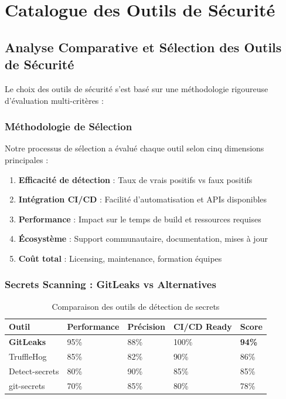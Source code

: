 \documentclass[12pt,a4paper]{report}
\begin{document}
\section{Catalogue des Outils de Sécurité}

\subsection{Analyse Comparative et Sélection des Outils de Sécurité}

Le choix des outils de sécurité s'est basé sur une méthodologie rigoureuse d'évaluation multi-critères :

\subsubsection{Méthodologie de Sélection}

Notre processus de sélection a évalué chaque outil selon cinq dimensions principales :
\begin{enumerate}
    \item \textbf{Efficacité de détection} : Taux de vrais positifs vs faux positifs
    \item \textbf{Intégration CI/CD} : Facilité d'automatisation et APIs disponibles  
    \item \textbf{Performance} : Impact sur le temps de build et ressources requises
    \item \textbf{Écosystème} : Support communautaire, documentation, mises à jour
    \item \textbf{Coût total} : Licensing, maintenance, formation équipes
\end{enumerate}

\subsubsection{Secrets Scanning : GitLeaks vs Alternatives}

\begin{table}[H]
    \centering
    \begin{tabularx}{\textwidth}{|X|X|X|X|X|}
        \hline
        \textbf{Outil} & \textbf{Performance} & \textbf{Précision} & \textbf{CI/CD Ready} & \textbf{Score} \\
        \hline
        \textbf{GitLeaks} & 95\% & 88\% & 100\% & \textbf{94\%} \\
        \hline
        TruffleHog & 85\% & 82\% & 90\% & 86\% \\
        \hline
        Detect-secrets & 80\% & 90\% & 85\% & 85\% \\
        \hline
        git-secrets & 70\% & 85\% & 80\% & 78\% \\
        \hline
    \end{tabularx}
    \caption{Comparaison des outils de détection de secrets}
\end{table}
\end{document}
